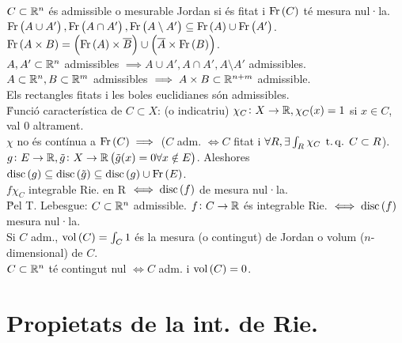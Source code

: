 \ci $C\subset\mathbb{R}^n$ és admissible o mesurable Jordan si és fitat i $\operatorname{Fr}\left( C \right)$ té mesura nul·la.\\
\ci $\operatorname{Fr}\left( A \cup A' \right), \operatorname{Fr}\left( A\cap A' \right), \operatorname{Fr}\left( A\setminus A' \right) \subseteq \operatorname{Fr}\left( A \right) \cup \operatorname{Fr}\left( A' \right)$. \\
\ci $\operatorname{Fr}\left( A\times B \right) = \left( \operatorname{Fr}\left( A \right)\times \overline{B} \right) \cup \left( \overline{A} \times \operatorname{Fr}\left( B \right) \right)$.\\
\ci $A,A'\subset\mathbb{R}^n$ admissibles $\implies A\cup A', A\cap A', A\setminus A'$ admissibles. \\
\ci $A\subset\mathbb{R}^n, B\subset\mathbb{R}^m$ admissibles $\implies A\times B \subset \mathbb{R}^{n+m}$ admissible. \\
\ci Els rectangles fitats i les boles euclidianes són admissibles. \\
\u{Funció característica de $C\subset X$}: (o indicatriu) $\chi_C\colon X \to \mathbb{R}, \chi_C(x) = 1$ si $x \in C$, val $0$ altrament.\\
\ci $\chi$ no és contínua a $\operatorname{Fr}\left( C \right) \implies$ ($C$ adm. $\iff C$ fitat i $\forall R, \exists \int_R \chi_C \operatorname{\;t.q.\;} C\subset R$). \\
\ci $g\colon E\to\mathbb{R}, \tilde{g}\colon X\to\mathbb{R} \left( \tilde{g}(x) = 0 \forall x \notin E \right)$. Aleshores $\operatorname{disc}\left( g \right) \subseteq \operatorname{disc}\left( \tilde{g} \right)\subseteq \operatorname{disc}\left( g \right)\cup \operatorname{Fr}\left( E \right)$. \\
\ci $f\chi_C$ integrable Rie. en R $\iff \operatorname{disc}\left( f \right)$ de mesura nul·la. \\
\u{Pel T. Lebesgue}: $C\subset \mathbb{R}^n$ admissible. $f\colon C \to \mathbb{R}$ és integrable Rie. $\iff \operatorname{disc}\left( f \right)$ mesura nul·la. \\
\ci Si $C$ adm., $\operatorname{vol}\left( C \right) = \int_C 1$ és la mesura (o contingut) de Jordan o volum ($n$-dimensional) de $C$. \\
\ci $C\subset\mathbb{R}^n$ té contingut nul $\iff C$ adm. i $\operatorname{vol}\left( C \right) = 0$.

\section{Propietats de la int. de Rie.}

